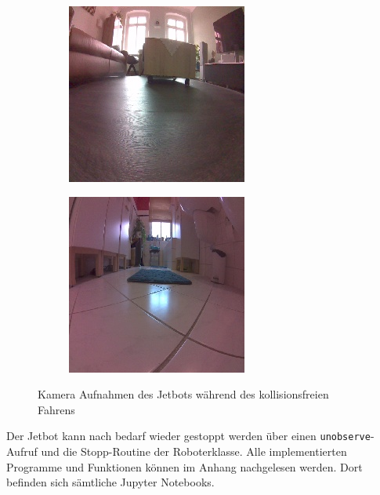 \begin{figure}[H]
    \centering
    \begin{subfigure}{0.45\textwidth}
        \includegraphics[width=0.9\linewidth]{Bilder/live-demo.jpg}
    \end{subfigure}
    \begin{subfigure}{0.45\textwidth}
        \includegraphics[width=0.9\linewidth]{Bilder/live-demo2.jpg}
    \end{subfigure}
    \label{fig:Bild4.3}
    \caption[Live Demo Jetbot]{Kamera Aufnahmen des Jetbots während des kollisionsfreien Fahrens}
\end{figure}

Der Jetbot kann nach bedarf wieder gestoppt werden über einen \texttt{unobserve}-Aufruf und die Stopp-Routine der Roboterklasse. Alle implementierten Programme und Funktionen können im Anhang nachgelesen werden. Dort befinden sich sämtliche Jupyter Notebooks.